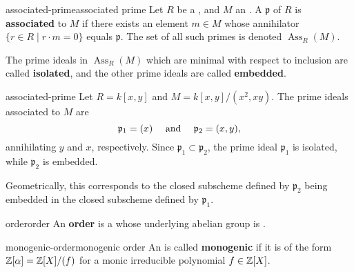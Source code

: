 \begin{topic}{associated-prime}{associated prime}
    Let $R$ be a , and $M$ an . A  $\mathfrak{p}$ of $R$ is \textbf{associated} to $M$ if there exists an element $m \in M$ whose annihilator $\{ r \in R \mid r \cdot m = 0 \}$ equals $\mathfrak{p}$. The set of all such primes is denoted $\operatorname{Ass}_R(M)$.
    
    The prime ideals in $\operatorname{Ass}_R(M)$ which are minimal with respect to inclusion are called \textbf{isolated}, and the other prime ideals are called \textbf{embedded}.
\end{topic}

\begin{example}{associated-prime}
    Let $R = k[x, y]$ and $M = k[x, y] / (x^2, xy)$. The prime ideals associated to $M$ are
    \[ \mathfrak{p}_1 = (x) \quad \textup{ and } \quad \mathfrak{p}_2 = (x, y) , \]
    annihilating $y$ and $x$, respectively. Since $\mathfrak{p}_1 \subset \mathfrak{p}_2$, the prime ideal $\mathfrak{p}_1$ is isolated, while $\mathfrak{p}_2$ is embedded.
    
    Geometrically, this corresponds to the closed subscheme defined by $\mathfrak{p}_2$ being embedded in the closed subscheme defined by $\mathfrak{p}_1$.
\end{example}

\begin{topic}{order}{order}
    An \textbf{order} is a  whose underlying abelian group is .
\end{topic}

\begin{topic}{monogenic-order}{monogenic order}
    An  is called \textbf{monogenic} if it is of the form $\mathbb{Z}[\alpha] = \mathbb{Z}[X] / (f)$ for a monic irreducible polynomial $f \in \mathbb{Z}[X]$.
\end{topic}
